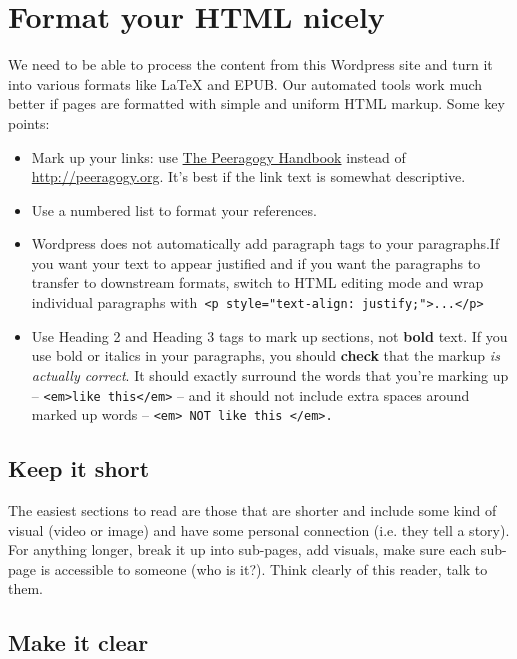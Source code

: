 \section{Format your HTML nicely}

We need to be able to process the content from this Wordpress site and
turn it into various formats like LaTeX and EPUB. Our automated tools
work much better if pages are formatted with simple and uniform HTML
markup. Some key points:

\begin{itemize}
\item
  Mark up your links: use \href{http://peeragogy.org}{The Peeragogy
  Handbook} instead of
  \href{http://peeragogy.org}{http://peeragogy.org}. It's best if the
  link text is somewhat descriptive.
\item
  Use a numbered list to format your references.
\item
  Wordpress does not automatically add paragraph tags to your
  paragraphs.If you want your text to appear justified and if you want
  the paragraphs to transfer to downstream formats, switch to HTML
  editing mode and wrap individual paragraphs
  with\texttt{ \textless{}p style="text-align: justify;"\textgreater{}...\textless{}/p\textgreater{}}
\item
  Use Heading 2 and Heading 3 tags to mark up sections, not
  \textbf{bold} text. If you use bold or italics in your paragraphs, you
  should \textbf{check} that the markup \emph{is actually correct}. It
  should exactly surround the words that you're marking up --
  \texttt{\textless{}em\textgreater{}like this\textless{}/em\textgreater{}}
  -- and it should not include extra spaces around marked up words --
  \texttt{\textless{}em\textgreater{} NOT like this \textless{}/em\textgreater{}.}
\end{itemize}
\subsection{Keep it short}

The easiest sections to read are those that are shorter and include some
kind of visual (video or image) and have some personal connection (i.e.
they tell a story). For anything longer, break it up into sub-pages, add
visuals, make sure each sub-page is accessible to someone (who is it?).
Think clearly of this reader, talk to them.

\subsection{Make it clear}

